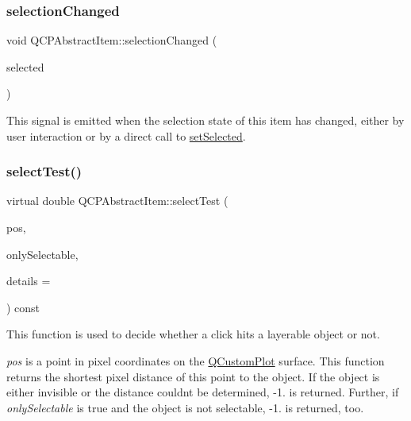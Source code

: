 \mbox{\label{class_q_c_p_abstract_item_aa5cffb034fc65dbb91c77e02c1c14251}} 
\subsubsection{\texorpdfstring{selection\+Changed}{selectionChanged}}
{\footnotesize\ttfamily void Q\+C\+P\+Abstract\+Item\+::selection\+Changed (\begin{DoxyParamCaption}\item[{bool}]{selected }\end{DoxyParamCaption})\hspace{0.3cm}{\ttfamily [signal]}}

This signal is emitted when the selection state of this item has changed, either by user interaction or by a direct call to \hyperlink{class_q_c_p_abstract_item_a203de94ad586cc44d16c9565f49d3378}{set\+Selected}. \mbox{\label{class_q_c_p_abstract_item_ae41d0349d68bb802c49104afd100ba2a}} 
\subsubsection{\texorpdfstring{select\+Test()}{selectTest()}}
{\footnotesize\ttfamily virtual double Q\+C\+P\+Abstract\+Item\+::select\+Test (\begin{DoxyParamCaption}\item[{const Q\+PointF \&}]{pos,  }\item[{bool}]{only\+Selectable,  }\item[{Q\+Variant $\ast$}]{details = {} }\end{DoxyParamCaption}) const\hspace{0.3cm}{\ttfamily [pure virtual]}}

This function is used to decide whether a click hits a layerable object or not.

{\itshape pos} is a point in pixel coordinates on the \hyperlink{class_q_custom_plot}{Q\+Custom\+Plot} surface. This function returns the shortest pixel distance of this point to the object. If the object is either invisible or the distance couldn\textquotesingle{}t be determined, -\/1. is returned. Further, if {\itshape only\+Selectable} is true and the object is not selectable, -\/1. is returned, too.

